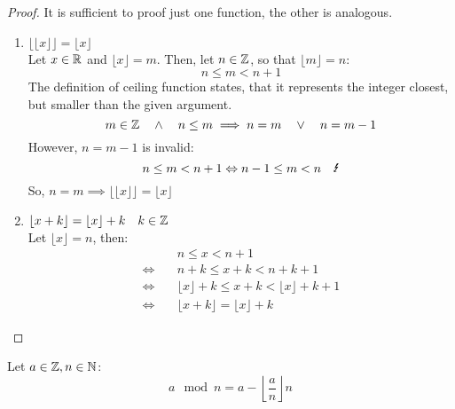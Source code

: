 \begin{proof}
    It is sufficient to proof just one function, the other is analogous.
    \begin{enumerate}
        \item $\lfloor \lfloor x \rfloor \rfloor = \lfloor x \rfloor$ \\
            Let $x \in \mathbb{R}$ and $\lfloor x \rfloor = m$.
            Then, let $n \in \mathbb{Z}$, so that $\lfloor m \rfloor = n$:
            \begin{equation}
                n \le m < n+1
            \end{equation}
            The definition of ceiling function states, that it represents the integer closest, 
            but smaller than the given argument.
            \begin{equation}
                m \in \mathbb{Z} \quad \land \quad n \le m \implies n=m \quad \lor \quad n=m-1
            \end{equation}
            However, $n=m-1$ is invalid:
            \begin{equation}
                n \le m < n+1 \Leftrightarrow n-1 \le m < n \quad \blitz
            \end{equation}
            So, $n=m \implies \lfloor \lfloor x \rfloor \rfloor = \lfloor x \rfloor$

        \item $\lfloor x + k \rfloor = \lfloor x \rfloor + k \quad k \in \mathbb{Z}$ \\
            Let $\lfloor x \rfloor = n$, then:
            \begin{align*}
                                & n \le x < n+1 \\
                \Leftrightarrow \quad & n+k \le x+k < n+k+1 \\
                \Leftrightarrow \quad  & \lfloor x \rfloor + k \le x+k < \lfloor x \rfloor + k+1 \\
                \Leftrightarrow \quad  & \lfloor x + k \rfloor = \lfloor x \rfloor + k
            \end{align*}
    \end{enumerate}
\end{proof}

\begin{definition}[Modulo]
    Let $a \in \mathbb{Z}, n \in \mathbb{N}$:
    \begin{equation}
        a \mod n = a - \left\lfloor \frac{a}{n} \right\rfloor n
    \end{equation}
\end{definition}

